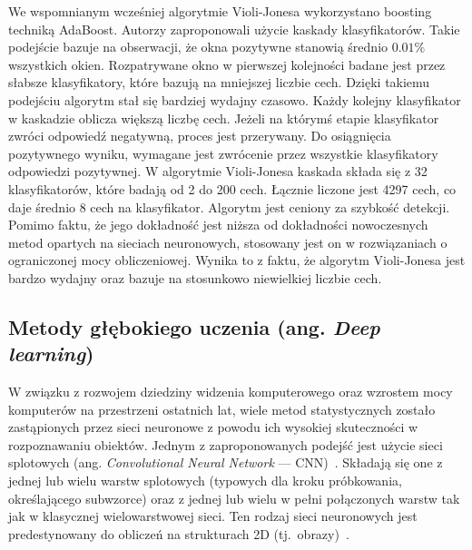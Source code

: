 We wspomnianym wcześniej algorytmie Violi-Jonesa wykorzystano boosting techniką AdaBoost.
Autorzy zaproponowali użycie kaskady klasyfikatorów.
Takie podejście bazuje na obserwacji, że okna pozytywne stanowią średnio $0.01\%$ wszystkich okien.
Rozpatrywane okno w pierwszej kolejności badane jest przez słabsze klasyfikatory, które bazują na mniejszej liczbie cech.
Dzięki takiemu podejściu algorytm stał się bardziej wydajny czasowo.
Każdy kolejny klasyfikator w kaskadzie oblicza większą liczbę cech.
Jeżeli na którymś etapie klasyfikator zwróci odpowiedź negatywną, proces jest przerywany.
Do osiągnięcia pozytywnego wyniku, wymagane jest zwrócenie przez wszystkie klasyfikatory odpowiedzi pozytywnej.
W algorytmie Violi-Jonesa kaskada składa się \linebreak z 32 klasyfikatorów, które badają od 2 do 200 cech.
Łącznie liczone jest 4297 cech, co daje średnio 8 cech na klasyfikator.
Algorytm jest ceniony za szybkość detekcji.
Pomimo faktu, że jego dokładność jest niższa od dokładności nowoczesnych metod opartych na sieciach neuronowych, stosowany jest on w rozwiązaniach o ograniczonej mocy obliczeniowej.
Wynika to z faktu, że algorytm Violi-Jonesa jest bardzo wydajny oraz bazuje na stosunkowo niewielkiej liczbie cech.

\subsection{Metody głębokiego uczenia (ang. \textit{Deep learning})}
W związku z rozwojem dziedziny widzenia komputerowego oraz wzrostem mocy komputerów na przestrzeni ostatnich lat, wiele metod statystycznych zostało zastąpionych przez sieci neuronowe z powodu ich wysokiej skuteczności w rozpoznawaniu obiektów.
Jednym z zaproponowanych podejść jest użycie sieci splotowych (ang. \textit{Convolutional Neural Network} --- CNN)~\cite{cnn_detector}.
Składają się one z jednej lub wielu warstw splotowych (typowych dla kroku próbkowania, określającego subwzorce) oraz z jednej lub wielu w pełni połączonych warstw tak jak w klasycznej wielowarstwowej sieci.
Ten rodzaj sieci neuronowych jest predestynowany do obliczeń na strukturach 2D (tj.\ obrazy)~\cite{cnn_agh}.

